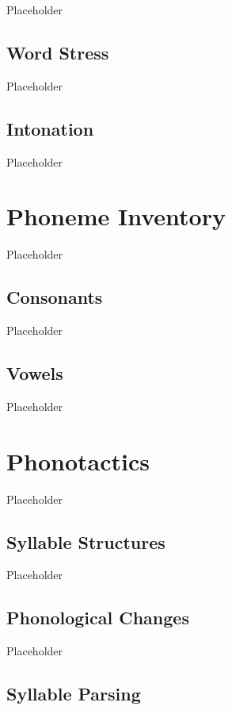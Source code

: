 Placeholder

\subsection{Word Stress}
\label{subsec:ank-word-stress}

Placeholder

\subsection{Intonation}
\label{subsec:ank-intonation}

Placeholder

\section{\langrdk{} Phoneme Inventory}
\label{sec:rdk-phone-inventory}

Placeholder

\subsection{Consonants}
\label{subsec:rdk-consonants}

Placeholder

\subsection{Vowels}
\label{subsec:rdk-vowels}

Placeholder

\section{\langrdk{} Phonotactics}
\label{sec:rdk-phonotactics}

Placeholder

\subsection{Syllable Structures}
\label{subsec:rdk-syll-struc}

Placeholder

\subsection{Phonological Changes}
\label{subsec:rdk-phone-changes}

Placeholder

\subsection{Syllable Parsing}
\label{subsec:rdk-syll-parse}

